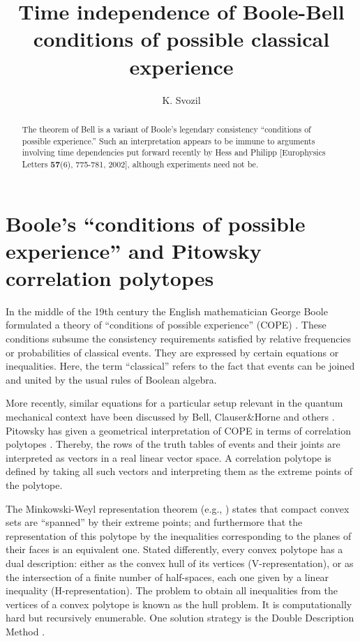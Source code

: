 \documentclass{epl}
\title{Time independence of Boole-Bell conditions of possible classical experience}
\author{K. Svozil\inst{1}}
\institute{
  \inst{1} Institut f\"ur Theoretische Physik, University of Technology Vienna,
Wiedner Hauptstra\ss e 8-10/136, A-1040 Vienna, Austria
}
\begin{document}
\maketitle

\begin{abstract}
The theorem of Bell is a variant of Boole's legendary
consistency ``conditions of possible experience.''
Such an interpretation appears to be immune to arguments involving time dependencies
put forward recently by Hess and Philipp [Europhysics Letters {\bf 57}(6), 775-781, 2002],
although experiments need not be.
\end{abstract}

\section{Boole's ``conditions of possible experience'' and Pitowsky correlation polytopes}

In the middle of the 19th century the English mathematician George Boole
formulated a theory of ``conditions of possible experience'' (COPE)
\cite{Boole,Boole-62,Hailperin,pitowsky,Pit-94}.
These conditions subsume the consistency requirements
satisfied by relative frequencies or probabilities of
classical events.
They are expressed by certain equations or inequalities.
Here, the term ``classical'' refers to the fact that events
can be joined and united by the usual rules of Boolean algebra.

More recently, similar equations for a particular setup relevant in the
quantum mechanical context have been discussed by Bell, Clauser\&Horne and others
\cite{bell-87,cl-horne,chsh,clauser}.
Pitowsky has given a geometrical interpretation
of COPE in terms of correlation polytopes
\cite{pitowsky-89a,pitowsky,Pit-91,Pit-94}.
Thereby, the rows of the truth tables of events and their joints are interpreted
as vectors in a real linear vector space.
A correlation polytope is defined by taking all such vectors and interpreting them as
the extreme points of the polytope.

The Minkowski-Weyl representation theorem (e.g., \cite[p. 29]{ziegler})
states that  compact convex sets
are ``spanned'' by their extreme points; and furthermore that the
representation of this polytope by the inequalities corresponding to the planes of their
faces is an equivalent one.
Stated differently, every convex polytope has a dual description:
either as the convex hull of its vertices (V-representation),
or as the intersection of a finite number of half-spaces,
each one given by a linear inequality (H-representation).
The problem to obtain all inequalities from the vertices of a convex
polytope is known as the  hull problem.
It is computationally hard  \cite{Pit-91} but recursively enumerable.
One solution strategy is the Double Description Method \cite{MRTT53}.
\end{document}
